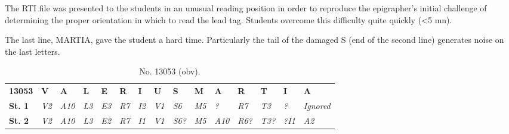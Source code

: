 \documentclass[amsthm,ebook]{saparticle}
\begin{document}
The RTI file was presented to the students in an unusual reading position in order to reproduce the epigrapher’s initial
challenge of determining the proper orientation in which to read the lead tag. Students overcome this difficulty quite
quickly ({\textless}5 mn).

The last line, MARTIA, gave the student a hard time. Particularly the tail of the damaged S (end of the second line)
generates noise on the last letters.

\begin{table}
{\small
\addtolength{\tabcolsep}{-0.8mm}

\begin{tabular*}{\textwidth}{lllllllllllllll}
 & & & & & & & & & & & & & \\
\toprule
\textbf{13053} & \textbf{V} & \textbf{A} & \textbf{L} & \textbf{E} & \textbf{R} & \textbf{I} & \textbf{U} & \textbf{S} & \textbf{M} & \textbf{A} & \textbf{R} & \textbf{T} & \textbf{I} & \textbf{A}\\ \midrule
\textbf{St. 1}& \textit{V2} & \textit{A10} & \textit{L3} & \textit{E3} & \textit{R7} & \textit{I2} & \textit{V1} & \textit{S6} & \textit{M5} & \textit{?} & \textit{R7} & \textit{T3} & \textit{?} & \textit{Ignored} \\
\textbf{St. 2}& \textit{V2} & \textit{A10} & \textit{L3} & \textit{E2} & \textit{R7} & \textit{I1} & \textit{V1} & \textit{S6?} & \textit{M5} & \textit{A10} & \textit{R6?} & \textit{T3?} & \textit{?I1} & \textit{A2} \\
\bottomrule
\end{tabular*}}

\caption{No. 13053 (obv).}
\label{tab:table2}
\end{table}
\end{document}
